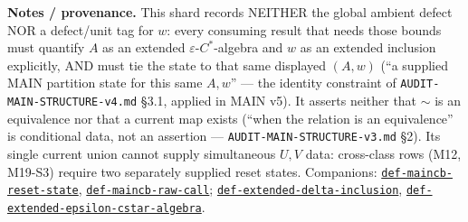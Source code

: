 \begin{defnote}
\par
\textbf{Notes / provenance.} This shard records NEITHER the global ambient defect
NOR a defect/unit tag for $w$: every consuming result that needs those
bounds must quantify $A$ as an extended $\varepsilon$-$C^*$-algebra and $w$
as an extended inclusion explicitly, AND must tie the state to that same
displayed $(A,w)$ (``a supplied MAIN partition state for this same $A,w$'' ---
the identity constraint of \texttt{AUDIT-\allowbreak{}MAIN-\allowbreak{}STRUCTURE-\allowbreak{}v4.\allowbreak{}md} \S{}3.1, applied in
MAIN v5). It asserts neither that $\sim$ is an equivalence nor that a
current map exists (``when the relation is an equivalence'' is conditional
data, not an assertion --- \texttt{AUDIT-\allowbreak{}MAIN-\allowbreak{}STRUCTURE-\allowbreak{}v3.\allowbreak{}md} \S{}2). Its single
current union cannot supply simultaneous $U,V$ data: cross-class rows (M12,
M19-S3) require two separately supplied reset states. Companions:
\hyperref[def:maincb-reset-state]{\texttt{def-\allowbreak{}maincb-\allowbreak{}reset-\allowbreak{}state}}, \hyperref[def:maincb-raw-call]{\texttt{def-\allowbreak{}maincb-\allowbreak{}raw-\allowbreak{}call}};
\hyperref[def:extended-delta-inclusion]{\texttt{def-\allowbreak{}extended-\allowbreak{}delta-\allowbreak{}inclusion}}, \hyperref[def:extended-epsilon-cstar-algebra]{\texttt{def-\allowbreak{}extended-\allowbreak{}epsilon-\allowbreak{}cstar-\allowbreak{}algebra}}.
\end{defnote}

